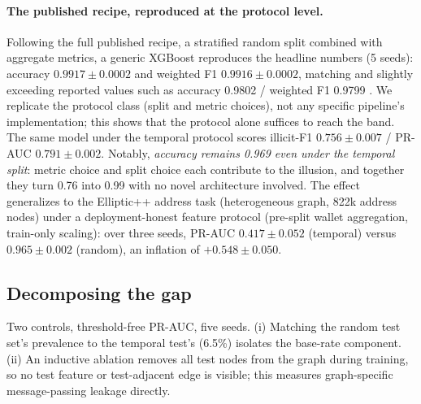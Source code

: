 \documentclass{article}
\begin{document}
\paragraph{The published recipe, reproduced at the protocol level.} Following the full published
recipe, a stratified random split combined with aggregate metrics, a generic
XGBoost reproduces the headline numbers (5 seeds): accuracy
$0.9917\pm0.0002$ and weighted F1 $0.9916\pm0.0002$, matching and slightly
exceeding reported values such as accuracy 0.9802 / weighted F1 0.9799
\citep{lin2026wavelet}. We replicate the protocol class (split and metric
choices), not any specific pipeline's implementation; this shows that the
protocol alone suffices to reach the band. The same
model under the temporal protocol scores illicit-F1 $0.756\pm0.007$ / PR-AUC
$0.791\pm0.002$. Notably, \emph{accuracy remains 0.969 even under the temporal
split}: metric choice and split choice each contribute to the illusion, and
together they turn 0.76 into 0.99 with no novel architecture involved. The effect
generalizes to the Elliptic++ address task (heterogeneous graph, 822k address
nodes) under a deployment-honest feature protocol (pre-split wallet aggregation,
train-only scaling): over three seeds, PR-AUC $0.417\pm0.052$ (temporal) versus
$0.965\pm0.002$ (random), an inflation of $+0.548\pm0.050$.

\subsection{Decomposing the gap}
\label{sec:decompose}
Two controls, threshold-free PR-AUC, five seeds. (i) Matching the random test
set's prevalence to the temporal test's (6.5\%) isolates the base-rate component.
(ii) An inductive ablation removes all test nodes from the graph during training,
so no test feature or test-adjacent edge is visible; this measures graph-specific
message-passing leakage directly.

\begin{table}[h]
\centering
\caption{Decomposition of the temporal-versus-random gap (PR-AUC, 5 seeds).}
\label{tab:decompose}
\end{table}
\end{document}
